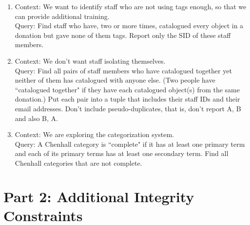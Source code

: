 \documentclass{article}
\begin{document}
\begin{enumerate}
\item
Context: We want to identify staff who are not using tags enough, so that we can provide
additional training. \\[5pt]
Query:
Find staff who have, two or more times,
catalogued every object in a donation
but gave none of them tags.
Report only the SID of these staff members.


\item
Context: We don't want staff isolating themselves. \\[5pt]
Query:
Find all pairs of staff members who have catalogued together
yet neither of them has catalogued with anyone else.
(Two people have ``catalogued together" if
they have each catalogued object(s) from the same donation.)
Put each pair into a tuple that includes their staff IDs and their email addresses.
Don't include pseudo-duplicates,
that is, don't report A, B and also B, A.


\item
Context: We are exploring the categorization system. \\[5pt]
Query:
A Chenhall category is ``complete" if it has at least one primary term
and each of its primary terms has at least one secondary term.
Find all Chenhall categories that are not complete.

\end{enumerate}





\section*{Part 2: Additional Integrity Constraints}
\end{document}
